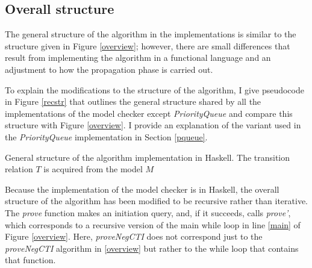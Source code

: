 \documentclass[12pt,a4paper,twoside,openright]{report}
\begin{document}
{\subsection{Overall structure}

The general structure of the algorithm in the implementations is similar
to the structure given in Figure \ref{overview}; however, there are
small differences that result from implementing the algorithm in a
functional language and an adjustment to how the propagation phase is
carried out.

To explain the modifications to the structure of the algorithm,
I give pseudocode in Figure \ref{recstr}
that outlines the general structure shared by all the
implementations of the model checker except {\it PriorityQueue}
and compare this structure with Figure \ref{overview}.
I provide an explanation of the variant used in the
{\it PriorityQueue} implementation in Section
\ref{pqueue}.

\begin{algorithm}[t]
\DontPrintSemicolon
{}
\caption{General structure of the algorithm implementation in Haskell. The transition relation $T$ is acquired
from the model $M$}
\label{recstr}
\end{algorithm}

Because the implementation of the model checker is in Haskell, the overall
structure of the algorithm has been modified to be recursive rather than iterative.
The {\it prove} function makes an initiation query, and, if it succeeds, calls
{\it prove'}, which corresponds to a recursive version of the main while loop
in line \ref{main} of Figure \ref{overview}. Here, {\it proveNegCTI}
does not correspond just to the {\it proveNegCTI} algorithm in \ref{overview} but rather
to the while loop that contains that function.

}
\end{document}
